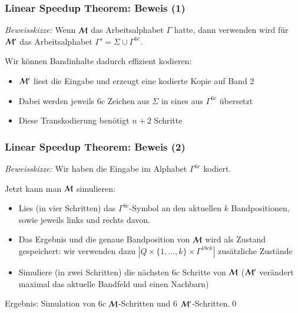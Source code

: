 \documentclass[aspectratio=1610,onlymath]{beamer}
\begin{document}
\begin{frame}\frametitle{Linear Speedup Theorem: Beweis (1)}


\pause\emph{Beweisskizze:} Wenn $\mathcal{M}$ das Arbeitsalphabet $\Gamma$ hatte, dann verwenden wird für $\mathcal{M}'$ das Arbeitsalphabet $\Gamma'=\Sigma\cup\Gamma^{6c}$.
\bigskip

Wir können Bandinhalte dadurch effizient kodieren:
\begin{itemize}
\item $\mathcal{M}'$ liest die Eingabe und erzeugt eine kodierte Kopie auf Band 2
\item Dabei werden jeweils $6c$ Zeichen aus $\Sigma$ in eines aus $\Gamma^{6c}$ übersetzt
\item Diese Transkodierung benötigt $n+2$ Schritte
\end{itemize}


\end{frame}

\begin{frame}\frametitle{Linear Speedup Theorem: Beweis (2)}


\emph{Beweisskizze:} Wir haben die Eingabe im Alphabet $\Gamma^{6c}$ kodiert.
\pause\medskip

Jetzt kann man $\mathcal{M}$ simulieren:
\begin{itemize}
\item Lies (in vier Schritten) das $\Gamma^{6c}$-Symbol an den aktuellen $k$ Bandpositionen,
sowie jeweils links und rechts davon. 
\item Das Ergebnis und die genaue Bandposition von $\mathcal{M}$ wird als Zustand gespeichert: wir verwenden dazu
$|Q\times\{1,\ldots,k\}\times \Gamma^{18c k}|$ zusätzliche Zustände
\item Simuliere (in zwei Schritten) die nächsten $6c$ Schritte von $\mathcal{M}$
($\mathcal{M}'$ verändert maximal das aktuelle Bandfeld und einen Nachbarn)
\end{itemize}
Ergebnis: Simulation von $6c$ $\mathcal{M}$-Schritten und $6$ $\mathcal{M}'$-Schritten.\qed

\end{frame}
\end{document}
